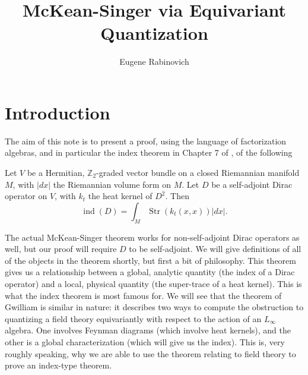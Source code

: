 \documentclass[11pt]{amsart}
\title[The McKean-Singer Formula via Equivariant Quantization]{McKean-Singer via Equivariant Quantization}
\author{Eugene Rabinovich}
\date{}
\newcommand{\Z}{\mathbb Z}
\numberwithin{equation}{section}
\newcommand\ind{\operatorname{ind}}
\newcommand\Str{\operatorname{Str}}
\begin{document}
\maketitle
\section{Introduction}
The aim of this note is to present a proof, using the language of factorization algebras, and in particular the index theorem in Chapter 7 of \cite{ref: othesis}, of the following 
\begin{theorem}
	Let $V$ be a Hermitian, $\Z_2$-graded vector bundle on a closed Riemannian manifold $M$, with $|dx|$ the Riemannian volume form on $M$. Let $D$ be a self-adjoint Dirac operator on $V$, with $k_t$ the heat kernel of $D^2$. Then
	\begin{equation}
		\label{eq: mcs}
		\ind(D)=\int_M \Str(k_t(x,x)) |dx|.
	\end{equation}
\end{theorem}

The actual McKean-Singer theorem works for non-self-adjoint Dirac operators as well, but our proof will require $D$ to be self-adjoint. We will give definitions of all of the objects in the theorem shortly, but first a bit of philosophy. This theorem gives us a relationship between a global, analytic quantity (the index of a Dirac operator) and a local, physical quantity (the super-trace of a heat kernel). This is what the index theorem is most famous for. We will see that the theorem of Gwilliam is similar in nature: it describes two ways to compute the obstruction to quantizing a field theory equivariantly with respect to the action of an $L_\infty$ algebra. One involves Feynman diagrams (which involve heat kernels), and the other is a global characterization (which will give us the index). This is, very roughly speaking, why we are able to use the theorem relating to field theory to prove an index-type theorem.
\end{document}
